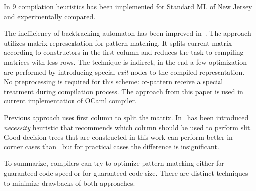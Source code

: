 In \cite{Scott2000WhenDM} 9 compilation heuristics has been implemented for Standard ML of New Jersey and experimentally compared. 

The inefficiency of backtracking automaton has been improved in~\cite{maranget2001}. The approach utilizes matrix representation for pattern matching. It splits current matrix  according to constructors in the first column and reduces the task to compiling matrices with less rows. The technique is indirect, in the end a few optimization are performed by introducing special \emph{exit} nodes to the compiled representation.
No preprocessing is required for this scheme: or-pattern receive a special treatment during compilation process.
 The approach from this paper is used in current implementation of OCaml compiler.

Previous approach uses first column to split the matrix. In~\cite{maranget2008} has been introduced \emph{necessity} heuristic that recommends which column should be used to perform slit. Good decision trees that are constructed in this work can perform better in corner cases than~\cite{maranget2001} but for practical cases the difference is insignificant.

To summarize, compilers can try to optimize pattern matching either for guaranteed code speed or for guaranteed code size. There are distinct techniques to minimize drawbacks of both approaches.

